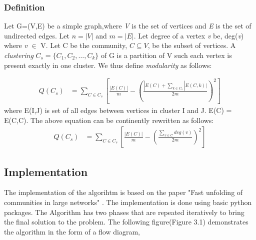 \subsubsection{Definition}
Let G=(V,E) be a simple graph,where \textit{V} is the set of vertices and \textit{E} is the set of undirected edges. Let $n=|V|$ and $m=|E|$. Let degree of a vertex \textit{v} be, deg(\textit{v}) where \textit{v} $\in$ V. Let C be the community, $C \subseteq V$, be the subset of vertices. A \textit{clustering} $C_s =\{C_1,C_2, \ldots, C_k\}$ of G is a partition of V such each vertex is present exactly in one cluster.  We thus define \textit{modularity } as follows: \cite{modularityNP}

\begin{equation} \label{eq1}
\begin{split}
Q(C_s) &= \sum_{C \in C_s}\left[ \frac{|E(C)|}{m} - \left( \frac{|E(C)+\sum_{k \in C_s}|E(C,k)|}{2m} \right)^2 \right]
\end{split}
\end{equation}
where E(I,J) is set of all edges between vertices in cluster I and J. E(C) = E(C,C).
The above equation can be continently rewritten as follows: 
\begin{equation} \label{eq1}
\begin{split}
Q(C_s) &= \sum_{C \in C_s}\left[ \frac{|E(C)|}{m} - \left( \frac{\sum_{v \in C}deg(v)}{2m} \right)^2 \right]
\end{split}
\end{equation}

\subsection{Implementation}

The implementation  of the algorihtm is based on the paper "Fast unfolding of communities in large networks" \cite{louvain}.  The implementation is done using basic python packages. 
 The Algorithm has two phases that are repeated iteratively to bring the final solution to the problem. The following figure(Figure 3.1) demonstrates the algorithm in the form of a flow diagram,

